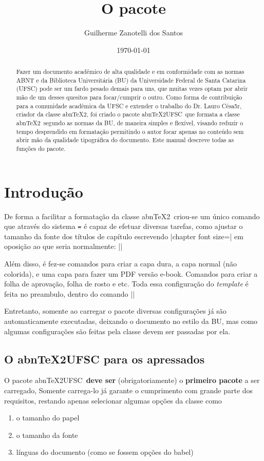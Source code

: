 \documentclass[openright]{memoir}
\title{\sffamily O pacote \abntexUFSC}
\date{\today}
\author{Guilherme Zanotelli dos Santos}
\newcommand*{\abntex}{abn\TeX2}
\newcommand*{\abntexUFSC}{abn\TeX2UFSC}
\newcommand{\emingles}[1]{\foreignlanguage{english}{\textit{#1}}}
\begin{document}
\pagestyle{simple}
\frontmatter
\maketitle
\begin{abstract}
Fazer um documento acadêmico de alta qualidade e em conformidade com as normas ABNT e da Biblioteca Universitária (BU) da Universidade Federal de Santa Catarina (UFSC) pode ser um fardo pesado demais para uns, que muitas vezes optam por abrir mão de um desses quesitos para focar/cumprir o outro. Como forma de contribuição para a comunidade acadêmica da UFSC e extender o trabalho do Dr. Lauro Césa5r, criador da classe \abntex, foi criado o pacote \abntexUFSC\ que formata a classe \abntex\ segundo as normas da BU, de maneira simples e flexível, visando reduzir o tempo desprendido em formatação permitindo o autor focar apenas no conteúdo sem abrir mão da qualidade tipográfica do documento. Este manual descreve todas as funções do pacote.
\end{abstract}
\tableofcontents*
\mainmatter
\chapter{Introdução}
De forma a facilitar a formatação da classe \abntex\ criou-se um único comando que através do sistema \texttt{=} é capaz de efetuar diversas tarefas, como ajustar o tamanho da fonte dos títulos de capítulo escrevendo \displaycode|chapter font size=\huge| em oposição ao que seria normalmente: \displaycode|\renewcommand{\ABNTEXchapterfontsize}{\huge}|

Além disso, é fez-se comandos para criar a capa dura, a capa normal (não colorida), e uma capa para fazer um PDF versão e-book. Comandos para criar a folha de aprovação, folha de rosto e etc. Toda essa configuração do \emingles{template} é feita no preambulo, dentro do comando \displaycode||

Entretanto, somente ao carregar o pacote diversas configurações já são automaticamente executadas, deixando o documento no estilo da BU, mas como algumas configurações são feitas pela classe devem ser passadas por ela.

\section{O \texorpdfstring{\abntexUFSC}{abnTeX2UFSC} para os apressados}
O pacote \abntexUFSC\ \textbf{deve ser} (obrigatoriamente) o \textbf{primeiro pacote} a ser carregado, Somente carrega-lo já garante o cumprimento com grande parte dos requisitos, restando apenas selecionar algumas opções da classe como \begin{enumerate}
\item o tamanho do papel
\item o tamanho da fonte
\item línguas do documento (como se fossem opções do babel)
\end{enumerate}
\end{document}
